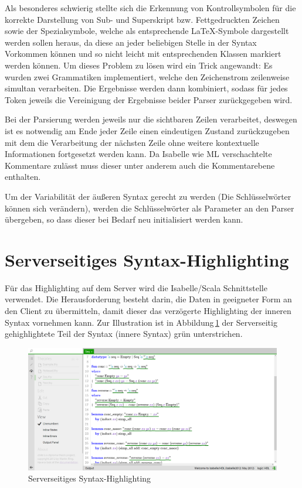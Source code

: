 Als besonderes schwierig stellte sich die Erkennung von Kontrollsymbolen für die korrekte
Darstellung von Sub- und Superskript bzw. Fettgedruckten Zeichen sowie der Spezialsymbole, welche
als entsprechende LaTeX-Symbole dargestellt werden sollen heraus, da diese an jeder beliebigen
Stelle in der Syntax Vorkommen können und so nicht leicht mit entsprechenden Klassen markiert werden
können. Um dieses Problem zu lösen wird ein Trick angewandt: Es wurden zwei Grammatiken
implementiert, welche den Zeichenstrom zeilenweise simultan verarbeiten. Die Ergebnisse werden dann
kombiniert, sodass für jedes Token jeweils die Vereinigung der Ergebnisse beider Parser
zurückgegeben wird.

Bei der Parsierung werden jeweils nur die sichtbaren Zeilen verarbeitet, deswegen ist es notwendig
am Ende jeder Zeile einen eindeutigen Zustand zurückzugeben mit dem die Verarbeitung der nächsten
Zeile ohne weitere kontextuelle Informationen fortgesetzt werden kann. Da Isabelle wie ML
verschachtelte Kommentare zulässt muss dieser unter anderem auch die Kommentarebene enthalten.

Um der Variabilität der äußeren Syntax gerecht zu werden (Die Schlüsselwörter können sich
verändern), werden die Schlüsselwörter als Parameter an den Parser übergeben, so dass dieser bei
Bedarf neu initialisiert werden kann.

\section{Serverseitiges Syntax-Highlighting}
\label{sec:ssyntax}

Für das Highlighting auf dem Server wird die Isabelle/Scala Schnittstelle verwendet. Die
Herausforderung besteht darin, die Daten in geeigneter Form an den Client zu übermitteln, damit
dieser das verzögerte Highlighting der inneren Syntax vornehmen kann. Zur Illustration ist in
Abbildung\,\ref{fig:sssyntax} der Serverseitig gehighlightete Teil der Syntax (innere Syntax)
grün unterstrichen.

\begin{figure}[ht]
\includegraphics[width=\linewidth]{images/sssyntax}
  \caption{Serverseitiges Syntax-Highlighting}
  \label{fig:sssyntax}
\end{figure}


